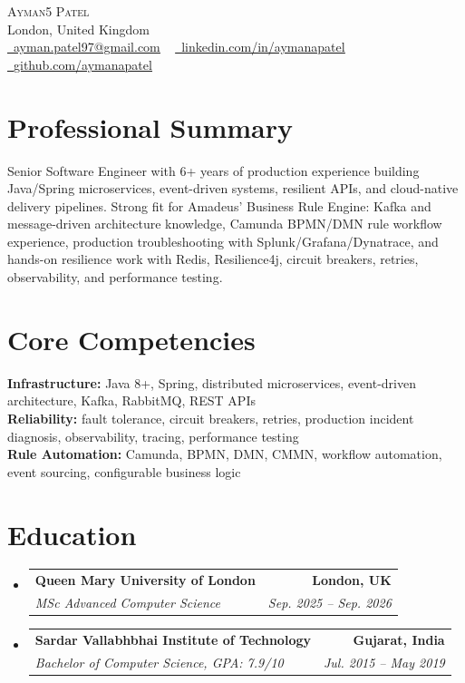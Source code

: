 \documentclass[letterpaper,11pt]{article}
\makeatletter
\newcommand{\resumeSubheading}[4]{
  \vspace{-3pt}\item
    \begin{tabular*}{1.0\textwidth}[t]{l@{\extracolsep{\fill}}r}
      \textbf{#1} & \textbf{\small #2} \\
      \textit{\small#3} & \textit{\small #4} \\
    \end{tabular*}\vspace{-7pt}
}
\newcommand{\resumeSubHeadingListStart}{\begin{itemize}[leftmargin=0.0in, label={}]}
\newcommand{\resumeSubHeadingListEnd}{\end{itemize}}
\makeatother
\begin{document}
    \begin{center}
        {\Huge\scshape Ayman5 Patel}
        \\ London, United Kingdom\\
        \small
        \href{mailto:ayman.patel97@gmail.com}{\raisebox{-0.2\height}\faEnvelope\  \underline{ayman.patel97@gmail.com}} ~
        \href{https://linkedin.com/in/aymanapatel}{\raisebox{-0.2\height}\faLinkedin\ \underline{linkedin.com/in/aymanapatel}}  ~
        \href{https://github.com/aymanapatel}{\raisebox{-0.2\height}\faGithub\ \underline{github.com/aymanapatel}}
    \end{center}

\section{Professional Summary}
\small{
Senior Software Engineer with 6+ years of production experience building Java/Spring microservices, event-driven systems, resilient APIs, and cloud-native delivery pipelines. Strong fit for Amadeus' Business Rule Engine: Kafka and message-driven architecture knowledge, Camunda BPMN/DMN rule workflow experience, production troubleshooting with Splunk/Grafana/Dynatrace, and hands-on resilience work with Redis, Resilience4j, circuit breakers, retries, observability, and performance testing.
}
\vspace{2pt}

\section{Core Competencies}
\vspace{-7pt}
\begin{itemize}[leftmargin=0.15in, label={}]\small{\item{
\textbf{Infrastructure:} Java 8+, Spring, distributed microservices, event-driven architecture, Kafka, RabbitMQ, REST APIs \\
\textbf{Reliability:} fault tolerance, circuit breakers, retries, production incident diagnosis, observability, tracing, performance testing \\
\textbf{Rule Automation:} Camunda, BPMN, DMN, CMMN, workflow automation, event sourcing, configurable business logic
}}
\end{itemize}

\section{Education}
  \resumeSubHeadingListStart
    \resumeSubheading
      {Queen Mary University of London}{London, UK}
      {MSc Advanced Computer Science}{Sep. 2025 -- Sep. 2026}
    \resumeSubheading
      {Sardar Vallabhbhai Institute of Technology}{Gujarat, India}
      {Bachelor of Computer Science, GPA: 7.9/10}{Jul. 2015 -- May 2019}
  \resumeSubHeadingListEnd
\end{document}
